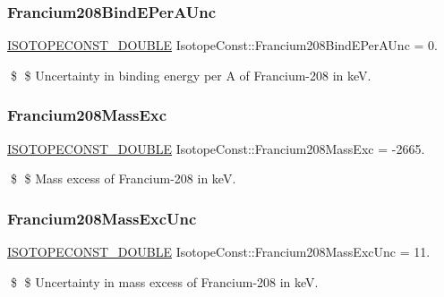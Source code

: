 \subsubsection{\texorpdfstring{Francium208\+Bind\+E\+Per\+A\+Unc}{Francium208BindEPerAUnc}}
{\footnotesize\ttfamily \mbox{\hyperlink{group___isotope_const-_macros_ga8f45a7272ce02c0b4c65c44636ed719a}{I\+S\+O\+T\+O\+P\+E\+C\+O\+N\+S\+T\+\_\+\+D\+O\+U\+B\+LE}} Isotope\+Const\+::\+Francium208\+Bind\+E\+Per\+A\+Unc = 0.}

\$ \$ Uncertainty in binding energy per A of Francium-\/208 in keV. \mbox{\label{group___isotope_const-_francium-_fr208_ga35dbc96670bbc62033350fe73fc482e5}} 
\subsubsection{\texorpdfstring{Francium208\+Mass\+Exc}{Francium208MassExc}}
{\footnotesize\ttfamily \mbox{\hyperlink{group___isotope_const-_macros_ga8f45a7272ce02c0b4c65c44636ed719a}{I\+S\+O\+T\+O\+P\+E\+C\+O\+N\+S\+T\+\_\+\+D\+O\+U\+B\+LE}} Isotope\+Const\+::\+Francium208\+Mass\+Exc = -\/2665.}

\$ \$ Mass excess of Francium-\/208 in keV. \mbox{\label{group___isotope_const-_francium-_fr208_gad5fc0df1ac6172be72f02a510447352a}} 
\subsubsection{\texorpdfstring{Francium208\+Mass\+Exc\+Unc}{Francium208MassExcUnc}}
{\footnotesize\ttfamily \mbox{\hyperlink{group___isotope_const-_macros_ga8f45a7272ce02c0b4c65c44636ed719a}{I\+S\+O\+T\+O\+P\+E\+C\+O\+N\+S\+T\+\_\+\+D\+O\+U\+B\+LE}} Isotope\+Const\+::\+Francium208\+Mass\+Exc\+Unc = 11.}

\$ \$ Uncertainty in mass excess of Francium-\/208 in keV. \mbox{\label{group___isotope_const-_francium-_fr208_gad66c99e87dd1b91ad769ace95a1a7de2}} 
